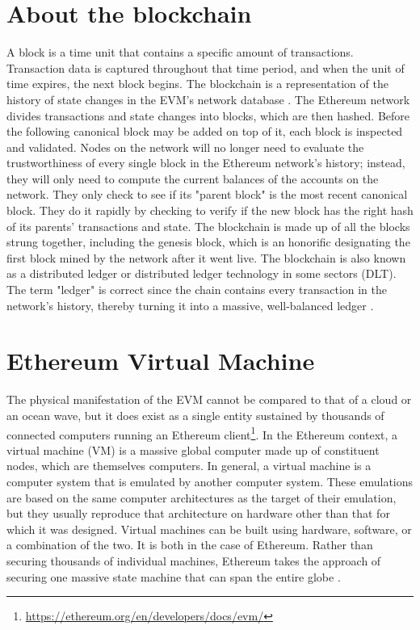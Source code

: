 \section{About the blockchain}
A block is a time unit that contains a specific amount of transactions. Transaction data is captured throughout that time period, and when the unit of time expires, the next block begins. The blockchain is a representation of the history of state changes in the EVM's network database \cite[43]{dannen2017introducing}.
The Ethereum network divides transactions and state changes into blocks, which are then hashed. Before the following canonical block may be added on top of it, each block is inspected and validated. Nodes on the network will no longer need to evaluate the trustworthiness of every single block in the Ethereum network's history; instead, they will only need to compute the current balances of the accounts on the network. They only check to see if its "parent block" is the most recent canonical block. They do it rapidly by checking to verify if the new block has the right hash of its parents' transactions and state.
The blockchain is made up of all the blocks strung together, including the genesis block, which is an honorific designating the first block mined by the network after it went live. The blockchain is also known as a distributed ledger or distributed ledger technology in some sectors (DLT). The term "ledger" is correct since the chain contains every transaction in the network's history, thereby turning it into a massive, well-balanced ledger \cite[55]{dannen2017introducing}. 
\section{Ethereum Virtual Machine}
\label{sec:evm}
The physical manifestation of the EVM cannot be compared to that of a cloud or an ocean wave, but it does exist as a single entity sustained by thousands of connected computers running an Ethereum client\footnote{\url{https://ethereum.org/en/developers/docs/evm/}}.
In the Ethereum context, a virtual machine (VM) is a massive global computer made up of constituent nodes, which are themselves computers. In general, a virtual machine is a computer system that is emulated by another computer system. These emulations are based on the same computer architectures as the target of their emulation, but they usually reproduce that architecture on hardware other than that for which it was designed. Virtual machines can be built using hardware, software, or a combination of the two. It is both in the case of Ethereum. Rather than securing thousands of individual machines, Ethereum takes the approach of securing one massive state machine that can span the entire globe \cite[48]{dannen2017introducing}.


